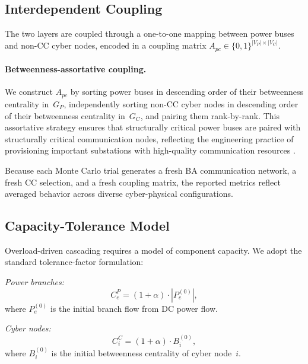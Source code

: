 \documentclass[a4paper,fleqn]{cas-dc}
\begin{document}
\subsection{Interdependent Coupling}\label{sec:coupling}

The two layers are coupled through a one-to-one mapping between power
buses and non-CC cyber nodes, encoded in a coupling matrix
$A_{pc}\in\{0,1\}^{|V_P|\times|V_C|}$.

\paragraph{Betweenness-assortative coupling.}
We construct $A_{pc}$ by sorting power buses in descending order of
their betweenness centrality in~$G_P$, independently sorting non-CC
cyber nodes in descending order of their betweenness centrality
in~$G_C$, and pairing them rank-by-rank.  This assortative strategy
ensures that structurally critical power buses are paired with
structurally critical communication nodes, reflecting the engineering
practice of provisioning important substations with high-quality
communication resources \citep{ChenTu2026}.

Because each Monte Carlo trial generates a fresh BA communication
network, a fresh CC selection, and a fresh coupling matrix, the reported
metrics reflect averaged behavior across diverse cyber-physical
configurations.

\subsection{Capacity-Tolerance Model}\label{sec:capacity}

Overload-driven cascading requires a model of component capacity.  We
adopt the standard tolerance-factor formulation:

\textit{Power branches:}
\begin{equation}\label{eq:cap_P}
  C_e^{P} = (1+\alpha)\cdot|P_e^{(0)}|,
\end{equation}
where $P_e^{(0)}$ is the initial branch flow from DC power flow.

\textit{Cyber nodes:}
\begin{equation}\label{eq:cap_Cn}
  C_i^{C} = (1+\alpha)\cdot B_i^{(0)},
\end{equation}
where $B_i^{(0)}$ is the initial betweenness centrality of cyber node~$i$.
\end{document}
